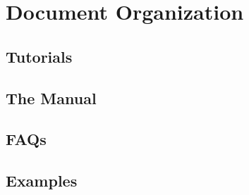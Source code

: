 \chapter{Document Organization}

\section{Tutorials}

\section{The Manual}

\section{FAQs}

\section{Examples}

